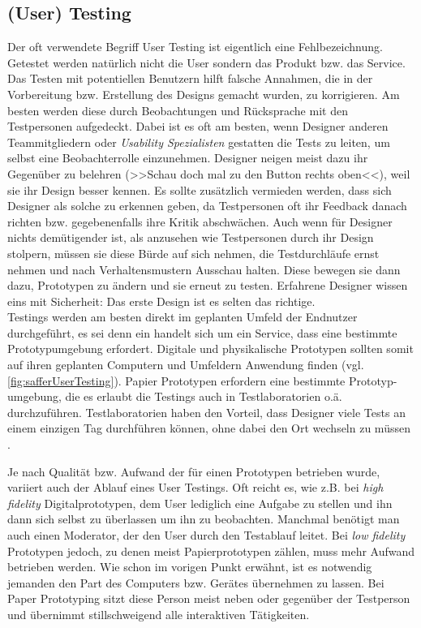 \subsection{(User) Testing}
Der oft verwendete Begriff User Testing ist eigentlich eine Fehlbezeichnung. Getestet werden natürlich nicht die User sondern das Produkt bzw. das Service. 
Das Testen mit potentiellen Benutzern hilft falsche Annahmen, die in der Vorbereitung bzw. Erstellung des Designs gemacht wurden, zu korrigieren. Am besten werden diese durch Beobachtungen und Rücksprache mit den Testpersonen aufgedeckt. Dabei ist es oft am besten, wenn Designer anderen Teammitgliedern oder \emph{Usability Spezialisten} gestatten die Tests zu leiten, um selbst eine Beobachterrolle einzunehmen. Designer neigen meist dazu ihr Gegenüber zu belehren (>>Schau doch mal zu den Button rechts oben<<), weil sie ihr Design besser kennen. Es sollte zusätzlich vermieden werden, dass sich Designer als solche zu erkennen geben, da Testpersonen oft ihr Feedback danach richten bzw. gegebenenfalls ihre Kritik abschwächen. Auch wenn für Designer nichts demütigender ist, als anzusehen wie Testpersonen durch ihr Design stolpern, müssen sie diese Bürde auf sich nehmen, die Testdurchläufe ernst nehmen und nach Verhaltensmustern Ausschau halten.  Diese bewegen sie dann dazu, Prototypen zu ändern und sie erneut zu testen. Erfahrene Designer wissen eins mit Sicherheit: Das erste Design ist es selten das richtige. \\
Testings werden am besten direkt im geplanten Umfeld der Endnutzer durchgeführt, es sei denn ein handelt sich um ein Service, dass eine bestimmte Prototypumgebung erfordert. Digitale und physikalische Prototypen sollten somit auf ihren geplanten Computern und Umfeldern Anwendung finden (vgl. \autoref{fig:safferUserTesting}). Papier Prototypen erfordern eine bestimmte Prototyp-umgebung, die es erlaubt die Testings auch in Testlaboratorien o.ä. durchzuführen. Testlaboratorien haben den Vorteil, dass Designer viele Tests an einem einzigen Tag durchführen können, ohne dabei den Ort wechseln zu müssen \citep{Saffer:2007}.

\medskip Je nach Qualität bzw. Aufwand der für einen Prototypen betrieben wurde, variiert auch der Ablauf eines User Testings. Oft reicht es, wie z.B. bei \emph{high fidelity} Digitalprototypen, dem User lediglich eine Aufgabe zu stellen und ihn dann sich selbst zu überlassen um ihn zu beobachten. Manchmal benötigt man auch einen Moderator, der den User durch den Testablauf leitet. Bei \emph{low fidelity} Prototypen jedoch, zu denen meist Papierprototypen zählen, muss mehr Aufwand betrieben werden. Wie schon im vorigen Punkt erwähnt, ist es notwendig jemanden den Part des Computers bzw. Gerätes übernehmen zu lassen. Bei Paper Prototyping sitzt diese Person meist neben oder gegenüber der Testperson und übernimmt stillschweigend alle interaktiven Tätigkeiten.

